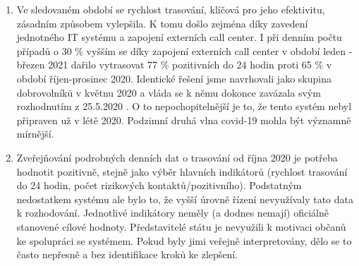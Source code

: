 \begin{enumerate}
\item Ve sledovaném období se rychlost trasování, klíčová pro jeho efektivitu, zásadním způsobem vylepšila. K tomu došlo zejména díky zavedení jednotného IT systému a zapojení externích call center. I při denním počtu případů o 30 \% vyšším se díky zapojení externích call center v období leden - březen 2021 dařilo vytrasovat 77 \% pozitivních do 24 hodin proti 65 \% v období říjen-prosinec 2020. Identické řešení jsme navrhovali jako skupina dobrovolníků v květnu 2020 \cite{tr_hlidac02} a vláda se k němu dokonce zavázala svým rozhodnutím z 25.5.2020 \cite{tr_vlada01}. O to nepochopitelnější je to, že tento systém nebyl připraven už v létě 2020. Podzimní druhá vlna covid-19 mohla být významně mírnější.
\item Zveřejňování podrobných denních dat o trasování od října 2020 je potřeba hodnotit pozitivně, stejně jako výběr hlavních indikátorů (rychlost trasování do 24 hodin, počet rizikových kontaktů/pozitivního). Podstatným nedostatkem systému ale bylo to, že vyšší úrovně řízení nevyužívaly tato data k rozhodování. Jednotlivé indikátory neměly (a dodnes nemají) oficiálně stanovené cílové hodnoty. Představitelé státu je nevyužili k motivaci občanů ke spolupráci se systémem. Pokud byly jimi veřejně interpretovány, dělo se to často nepřesně a bez identifikace kroků ke zlepšení.


\end{enumerate}
